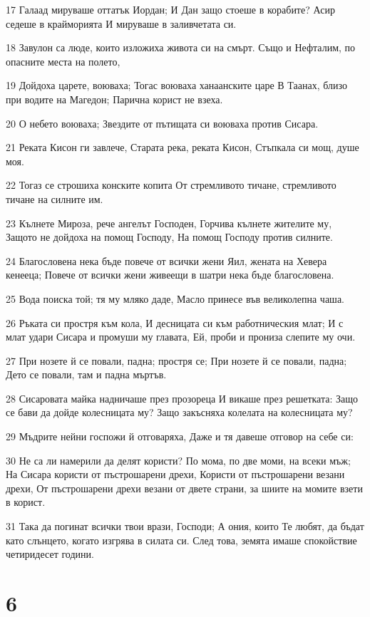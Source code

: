 \par 17 Галаад мируваше оттатък Иордан; И Дан защо стоеше в корабите? Асир седеше в крайморията И мируваше в заливчетата си.
\par 18 Завулон са люде, които изложиха живота си на смърт. Също и Нефталим, по опасните места на полето,
\par 19 Дойдоха царете, воюваха; Тогас воюваха ханаанските царе В Таанах, близо при водите на Магедон; Парична корист не взеха.
\par 20 О небето воюваха; Звездите от пътищата си воюваха против Сисара.
\par 21 Реката Кисон ги завлече, Старата река, реката Кисон, Стъпкала си мощ, душе моя.
\par 22 Тогаз се строшиха конските копита От стремливото тичане, стремливото тичане на силните им.
\par 23 Кълнете Мироза, рече ангелът Господен, Горчива кълнете жителите му, Защото не дойдоха на помощ Господу, На помощ Господу против силните.
\par 24 Благословена нека бъде повече от всички жени Яил, жената на Хевера кенееца; Повече от всички жени живеещи в шатри нека бъде благословена.
\par 25 Вода поиска той; тя му мляко даде, Масло принесе във великолепна чаша.
\par 26 Ръката си простря към кола, И десницата си към работническия млат; И с млат удари Сисара и промуши му главата, Ей, проби и прониза слепите му очи.
\par 27 При нозете й се повали, падна; простря се; При нозете й се повали, падна; Дето се повали, там и падна мъртъв.
\par 28 Сисаровата майка надничаше през прозореца И викаше през решетката: Защо се бави да дойде колесницата му? Защо закъсняха колелата на колесницата му?
\par 29 Мъдрите нейни госпожи й отговаряха, Даже и тя давеше отговор на себе си:
\par 30 Не са ли намерили да делят користи? По мома, по две моми, на всеки мъж; На Сисара користи от пъстрошарени дрехи, Користи от пъстрошарени везани дрехи, От пъстрошарени дрехи везани от двете страни, за шиите на момите взети в корист.
\par 31 Така да погинат всички твои врази, Господи; А ония, които Те любят, да бъдат като слънцето, когато изгрява в силата си. След това, земята имаше спокойствие четиридесет години.

\chapter{6}

